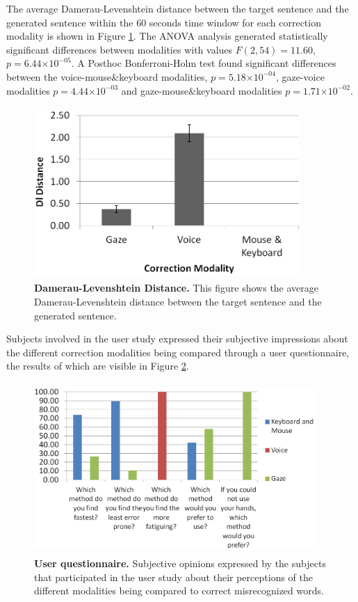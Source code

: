 \documentclass[]{article}
\providecommand{\e}[1]{\ensuremath{\times 10^{#1}}}
\begin{document}
The average Damerau-Levenshtein distance between the target sentence and the generated sentence within the 60 seconds
time window for each correction modality is shown in Figure \ref{dldistance}. The ANOVA analysis generated statistically
significant differences between modalities with values $F(2,54)=11.60$, $p=6.44\e{-05}$. A Posthoc Bonferroni-Holm test
found significant differences between the voice-mouse\&keyboard modalities, $p=5.18\e{-04}$, gaze-voice modalities
$p=4.44\e{-03}$ and gaze-mouse\&keyboard modalities $p=1.71\e{-02}$.


\begin{figure}[ht]
\begin{center}
\vspace{-3mm}
\includegraphics[width=0.9\textwidth,height=65mm]{figures/dldistance.png}
\end{center}
\caption{\textbf{Damerau-Levenshtein Distance.} This figure shows the average Damerau-Levenshtein distance between the 
target sentence and the generated sentence.}
\label{dldistance}
\end{figure}


Subjects involved in the user study  expressed their subjective impressions about the different correction
modalities being compared through a user questionnaire, the results of which are visible in Figure \ref{questionnaire}.


\begin{figure}[ht]
\begin{center}
\vspace{-3mm}
\includegraphics[width=0.95\textwidth,height=65mm]{figures/questionnaire.png}
\end{center}
\caption{\textbf{User questionnaire.} Subjective opinions expressed by the subjects that participated in the user
study about their perceptions of the different modalities being compared to correct misrecognized words.}
\label{questionnaire}
\end{figure}
\end{document}
